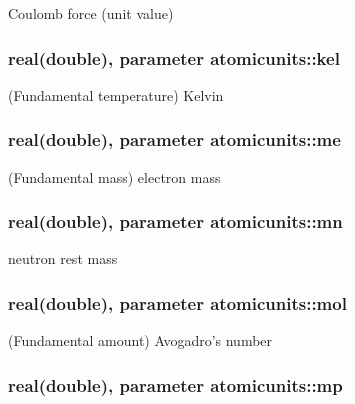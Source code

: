 Coulomb force (unit value) 

\hypertarget{classatomicunits_a0b4d6ac453558bc86022587236f7d076}{
\subsubsection[{kel}]{\setlength{\rightskip}{0pt plus 5cm}real(double), parameter atomicunits\+::kel}}\label{classatomicunits_a0b4d6ac453558bc86022587236f7d076}


(Fundamental temperature) Kelvin 

\hypertarget{classatomicunits_a02f36d49c4a56d1cc84c8cda6c631a68}{
\subsubsection[{me}]{\setlength{\rightskip}{0pt plus 5cm}real(double), parameter atomicunits\+::me}}\label{classatomicunits_a02f36d49c4a56d1cc84c8cda6c631a68}


(Fundamental mass) electron mass 

\hypertarget{classatomicunits_a001e0a01ab152644eb7df31ade44b290}{
\subsubsection[{mn}]{\setlength{\rightskip}{0pt plus 5cm}real(double), parameter atomicunits\+::mn}}\label{classatomicunits_a001e0a01ab152644eb7df31ade44b290}


neutron rest mass 

\hypertarget{classatomicunits_af00d60f8fc301784d6e48a53e524a4c8}{
\subsubsection[{mol}]{\setlength{\rightskip}{0pt plus 5cm}real(double), parameter atomicunits\+::mol}}\label{classatomicunits_af00d60f8fc301784d6e48a53e524a4c8}


(Fundamental amount) Avogadro's number 

\hypertarget{classatomicunits_a62f37608529c74a442a81baa515965d6}{
\subsubsection[{mp}]{\setlength{\rightskip}{0pt plus 5cm}real(double), parameter atomicunits\+::mp}}\label{classatomicunits_a62f37608529c74a442a81baa515965d6}



